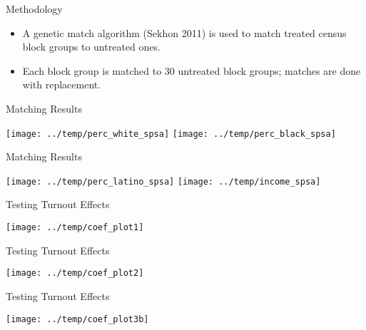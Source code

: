 \documentclass[
  ignorenonframetext,
]{beamer}
\begin{document}
\begin{frame}{Methodology}
\protect\hypertarget{methodology}{}
\begin{itemize}
\item
  A genetic match algorithm (Sekhon 2011) is used to match treated
  census block groups to untreated ones.
\item
  Each block group is matched to 30 untreated block groups; matches are
  done with replacement.
\end{itemize}
\end{frame}

\begin{frame}{Matching Results}
\protect\hypertarget{matching-results}{}
\begin{center}\texttt{[image: ../temp/perc\_white\_spsa]} \texttt{[image: ../temp/perc\_black\_spsa]} \end{center}
\end{frame}

\begin{frame}{Matching Results}
\protect\hypertarget{matching-results-1}{}
\begin{center}\texttt{[image: ../temp/perc\_latino\_spsa]} \texttt{[image: ../temp/income\_spsa]} \end{center}
\end{frame}

\begin{frame}{Testing Turnout Effects}
\protect\hypertarget{testing-turnout-effects}{}
\begin{center}\texttt{[image: ../temp/coef\_plot1]} \end{center}
\end{frame}

\begin{frame}{Testing Turnout Effects}
\protect\hypertarget{testing-turnout-effects-1}{}
\begin{center}\texttt{[image: ../temp/coef\_plot2]} \end{center}
\end{frame}

\begin{frame}{Testing Turnout Effects}
\protect\hypertarget{testing-turnout-effects-2}{}
\begin{center}\texttt{[image: ../temp/coef\_plot3b]} \end{center}
\end{frame}
\end{document}

